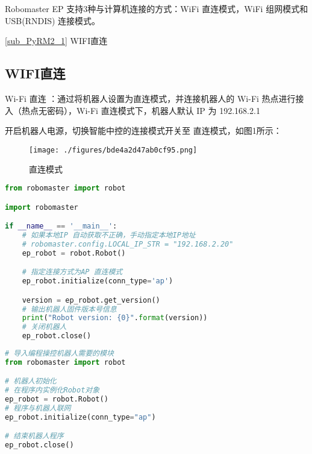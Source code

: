 
Robomaster EP 支持3种与计算机连接的方式：WiFi 直连模式，WiFi 组网模式和 USB(RNDIS) 连接模式。

\autoref{sub_PyRM2_1} WIFI直连

\subsection{WIFI直连}\label{sub_PyRM2_1}

Wi-Fi 直连 ：通过将机器人设置为直连模式，并连接机器人的 Wi-Fi 热点进行接入（热点无密码），Wi-Fi 直连模式下，机器人默认 IP 为 192.168.2.1

开启机器人电源，切换智能中控的连接模式开关至 直连模式，如图1所示：

\begin{figure}[ht]
\centering
\texttt{[image: ./figures/bde4a2d47ab0cf95.png]}
\caption{直连模式} \label{fig_PyRM2_1}
\end{figure}

\begin{lstlisting}[language=python]
from robomaster import robot

import robomaster

if __name__ == '__main__':
    # 如果本地IP 自动获取不正确，手动指定本地IP地址
    # robomaster.config.LOCAL_IP_STR = "192.168.2.20"
    ep_robot = robot.Robot()

    # 指定连接方式为AP 直连模式
    ep_robot.initialize(conn_type='ap')

    version = ep_robot.get_version()
    # 输出机器人固件版本号信息
    print("Robot version: {0}".format(version))
    # 关闭机器人
    ep_robot.close()
\end{lstlisting}


\begin{lstlisting}[language=python]
# 导入编程操控机器人需要的模块
from robomaster import robot

# 机器人初始化
# 在程序内实例化Robot对象
ep_robot = robot.Robot()
# 程序与机器人联网
ep_robot.initialize(conn_type="ap")

# 结束机器人程序
ep_robot.close()
\end{lstlisting}
